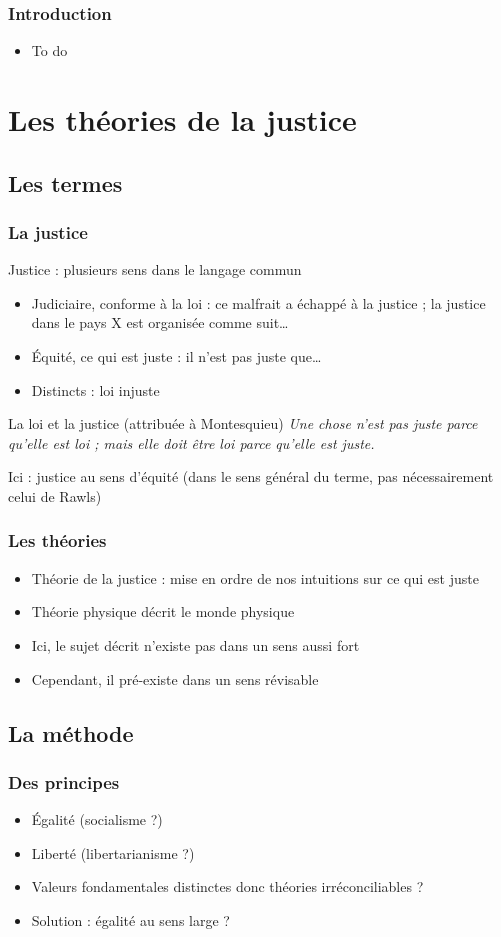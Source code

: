 \documentclass[french]{beamer}
\begin{document}
\begin{frame}
	\frametitle{Introduction}
	\begin{itemize}
		\item To do
	\end{itemize}
\end{frame}

\section{Les théories de la justice}
\subsection{Les termes}
\begin{frame}
	\frametitle{La justice}
  Justice : plusieurs sens dans le langage commun
	\begin{itemize}
		\item Judiciaire, conforme à la loi : ce malfrait a échappé à la justice ; la justice dans le pays X est organisée comme suit…
		\item Équité, ce qui est juste : il n’est pas juste que…
		\item Distincts : loi injuste
	\end{itemize}
	\begin{block}{La loi et la justice (attribuée à Montesquieu)}
    \emph{Une chose n’est pas juste parce qu’elle est loi ; mais elle doit être loi parce qu’elle est juste.}
  \end{block}
  Ici : justice au sens d’équité {\small (dans le sens général du terme, pas nécessairement celui de Rawls)}
\end{frame}

\begin{frame}
	\frametitle{Les théories}
	\begin{itemize}
		\item Théorie de la justice : mise en ordre de nos intuitions sur ce qui est juste
		\item Théorie physique décrit le monde physique
		\item Ici, le sujet décrit n’existe pas dans un sens aussi fort
    \item Cependant, il pré-existe dans un sens révisable
	\end{itemize}
\end{frame}

\subsection{La méthode}
\begin{frame}
	\frametitle{Des principes}
	\begin{itemize}
		\item Égalité (socialisme ?)
		\item Liberté (libertarianisme ?)
		\item Valeurs fondamentales distinctes donc théories irréconciliables ?
		\item Solution \citep{dworkin_taking_1978} : égalité au sens large ?
	\end{itemize}
\end{frame}
\end{document}
